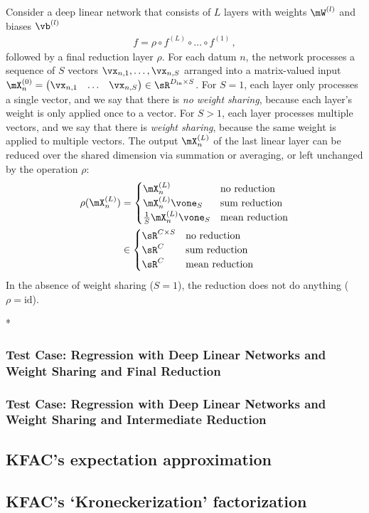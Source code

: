 \begin{setup}
  Consider a deep linear network that consists of $L$ layers with weights $\mW^{(l)}$ and biases $\vb^{(l)}$
  \begin{align*}
    f = \rho \circ f^{(L)} \circ \ldots \circ f^{(1)}\,,
  \end{align*}
  followed by a final reduction layer $\rho$. For each datum $n$, the network processes a sequence of $S$ vectors $\vx_{n,1}, \dots, \vx_{n,S}$ arranged into a matrix-valued input $\mX^{(0)}_n = \begin{pmatrix} \vx_{n,1} & \ldots & \vx_{n,S} \end{pmatrix} \in \sR^{D_{\text{in}} \times S}$.
  For $S=1$, each layer only processes a single vector, and we say that there is \emph{no weight sharing}, because each layer's weight is only applied once to a vector.
  For $S>1$, each layer processes multiple vectors, and we say that there is \emph{weight sharing}, because the same weight is applied to multiple vectors.
  The output $\mX^{(L)}_n$ of the last linear layer can be reduced over the shared dimension via summation or averaging, or left unchanged by the operation $\rho$:
  \begin{align*}
    \rho(\mX_n^{(L)})
    &=
      \begin{cases}
        \mX_n^{(L)} & \text{no reduction}
        \\
        \mX_n^{(L)} \vone_S & \text{sum reduction}
        \\
        \frac{1}{S} \mX_n^{(L)} \vone_S & \text{mean reduction}
      \end{cases}
    \\
    &\in
      \begin{cases}
        \sR^{C \times S} & \text{no reduction}
        \\
        \sR^C & \text{sum reduction}
        \\
        \sR^C & \text{mean reduction}
      \end{cases}
  \end{align*}
  In the absence of weight sharing ($S = 1$), the reduction does not do anything ($\rho = \mathrm{id}$).
\end{setup}

\switchcolumn[1]*
\switchcolumn[0]
\subsubsection{Test Case: Regression with Deep Linear Networks and Weight Sharing and Final Reduction}

\subsubsection{Test Case: Regression with Deep Linear Networks and Weight Sharing and Intermediate Reduction}

\subsection{KFAC's expectation approximation}

\subsection{KFAC's `Kroneckerization' factorization}

